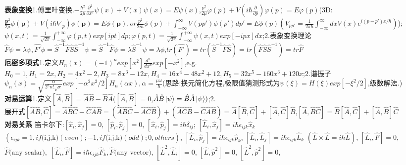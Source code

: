 \documentclass[UTF8,a4paper,7pt,twocolumn]{ctexart}
\begin{document}
      \textbf{表象变换}1.傅里叶变换.$-\frac{\hbar^2}{2\mu}\frac{\partial^2}{\partial x^2}\psi(x)+V(x)\psi(x)=E\psi(x)$,$\frac{p^2}{2\mu}\varphi(p)+V(i\hbar\frac{\partial}{\partial p})\varphi(p)=E\varphi(p)$(3D:$\frac{\boldsymbol{p}^2}{2\mu}\phi(\boldsymbol{p})+V(i\hbar\nabla_{p})\phi(\boldsymbol{p})=E\phi(\boldsymbol{p}),or \frac{p^2}{2m}\phi(p)+\int_{-\infty}^{\infty}V(pp')\phi(p')dp'=E\phi(p)(V_{pp'}=\frac{1}{2\pi\hbar}\int_{-\infty}^{\infty}dxV(x)e^{i(p-p')x/\hbar})$);$\psi(x,t)=\frac{1}{\sqrt{2\pi}}\int_{-\infty}^{+\infty}\varphi(p,t)exp[ipt]dp;\varphi(p,t)=\frac{1}{\sqrt{2\pi}}\int_{-\infty}^{+\infty}\psi(x,t)exp[-ipx]dx$;2.表象变换理论$\hat{F}\psi=\lambda\psi,\hat{F'}\phi=\hat{S}^{-1}\hat{F}\hat{S}\hat{S}^{-1}\psi=\hat{S}^{-1}\hat{F}\psi=\lambda\hat{S}^{-1}\psi=\lambda\phi$,$tr(\hat{F'})=tr(\hat{S}^{-1}\hat{F}\hat{S})=tr(\hat{F}\hat{S}\hat{S}^{-1})=tr \hat{F}$\\
      \textbf{厄密多项式}1.$\text{定义}H_{n}(x)=(-1)^{n}exp[x^{2}]\frac{d^{n}}{dx^{n}}exp[-x^{2}]$,e.g.$H_{0}=1,H_{1}=2x,H_{2}=4x^{2}-2,H_{3}=8x^{3}-12x,H_{4}=16x^4-48x^{2}+12,H_{5}=32x^{5}-160x^3+120x$;2.谐振子$\psi_{n}(x)=\sqrt{\frac{\alpha}{2^{n}n!\sqrt{\pi}}}exp[-\alpha^{2}x^{2}/2]H_{n}(\alpha x),\alpha=\frac{\mu\omega}{\hbar}$(思路:换元简化方程,极限值猜测形式为$\psi(\xi)=H(\xi)exp[-\xi^2/2]$,级数解法.)\\
      \textbf{对易运算}1.$\text{定义}[\hat{A},\hat{B}]=\hat{A}\hat{B}-\hat{B}\hat{A}([\hat{A},\hat{B}]=0$,$\hat{A}\hat{B}\Ket{\psi}=\hat{B}\hat{A}\Ket{\psi})$;2.$\text{展开式}[\hat{A}\hat{B},\hat{C}]=\hat{A}\hat{B}\hat{C}-\hat{C}\hat{A}\hat{B}=(\hat{A}\hat{B}\hat{C}-\hat{A}\hat{C}\hat{B})+(\hat{A}\hat{C}\hat{B}-\hat{C}\hat{A}\hat{B})=\hat{A}[\hat{B},\hat{C}]+[\hat{A},\hat{C}]\hat{B}$,$[\hat{A},\hat{B}\hat{C}]=\hat{B}[\hat{A},\hat{C}]+[\hat{A},\hat{B}]\hat{C}$\\
      \textbf{对易关系}
    $\text{笛卡尔下:}[\hat{x}_{i},\hat{x}_{j}]=0$,
    $[\hat{p}_{i},\hat{p}_{j}]=0$,
    $[\hat{x}_{i},\hat{p}_{j}]=i\hbar\delta_{ij}$;
    $[\hat{L}_{i},\hat{x}_{j}]=i\hbar\epsilon_{ijk}\hat{x}_{k}$
    $(\epsilon_{ijk}=1,if\text{(i,j,k)}(even);-1,if\text{(i,j,k)}(odd);0,others)$,
    $[\hat{L}_{i},\hat{p}_{j}]=i\hbar\epsilon_{ijk}\hat{p}_{k}$,
    $[\hat{L}_{i},\hat{L}_{j}]=i\hbar\epsilon_{ijk}\hat{L}_{k}$
    $(\hat{L}\times\hat{L}=i\hbar\hat{L})$,
    $[\hat{L}_{i},\hat{F}]=0$,$\hat{F}\text{(any scalar)},$
    $[\hat{L}_{i},\hat{F}]=i\hbar\epsilon_{ijk}\hat{F}_{k},\hat{F}\text{(any vector)}$,
    $[\hat{L}^{2},\hat{L}_{i}]=0$,
    $[\hat{L},\hat{p}^{2}]=0$,
    $[\hat{L}^{2},\hat{p}^{2}]=0$,
\end{document}
